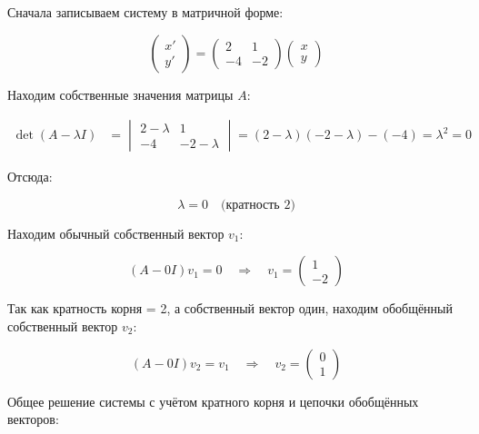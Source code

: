 Сначала записываем систему в матричной форме:

\begin{equation*}
    \begin{pmatrix} x' \\ y' \end{pmatrix} =
    \begin{pmatrix}
        2 & 1 \\
        -4 & -2
    \end{pmatrix}
    \begin{pmatrix} x \\ y \end{pmatrix}
\end{equation*}

Находим собственные значения матрицы \(A\):

\begin{align*}
    \det(A - \lambda I) &=
    \begin{vmatrix}
        2-\lambda & 1 \\
        -4 & -2-\lambda
    \end{vmatrix}
    = (2-\lambda)(-2-\lambda) - (-4) = \lambda^2 = 0
\end{align*}

Отсюда:

\begin{equation*}
    \lambda = 0 \quad \text{(кратность 2)}
\end{equation*}

Находим обычный собственный вектор \(v_1\):

\begin{equation*}
(A - 0 I)v_1 = 0 \quad \Rightarrow \quad v_1 = \begin{pmatrix} 1 \\ -2 \end{pmatrix}
\end{equation*}

Так как кратность корня = 2, а собственный вектор один, находим обобщённый собственный вектор \(v_2\):

\begin{equation*}
(A - 0 I)v_2 = v_1 \quad \Rightarrow \quad v_2 = \begin{pmatrix} 0 \\ 1 \end{pmatrix}
\end{equation*}

Общее решение системы с учётом кратного корня и цепочки обобщённых векторов:


